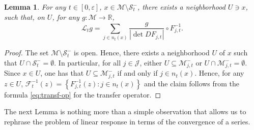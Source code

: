 \documentclass{amsart}
\numberwithin{equation}{section}
\newtheorem{lemma}[theorem]{Lemma}
\newcommand\ve{\varepsilon}
\newcommand\cF{{\mathcal F}}
\newcommand\cJ{{\mathcal J}}
\newcommand\cL{{\mathcal L}}
\newcommand\cM{{\mathcal M}}
\newcommand\cS{{\mathcal S}}
\newcommand\bR{{\mathbb R}}
\begin{document}
\begin{lemma}
  \label{lem:tr-op}
  For any \(t \in [0,\ve]\), \(x \in \cM \setminus \cS_t^{-}\), there exists a neighborhood \(U \ni x\), such that, on \(U\), for any \(g: \cM \to \bR\),
  \[
  \cL_t g = \sum_{j \in n_t(x)} \frac{g }{\left|\det D F_{j,t}\right|}\circ F_{j,t}^{-1}.
  \]
  \end{lemma}
  \begin{proof}
  The set \(\cM \setminus \cS^{-}_t\) is open. Hence, there exists a neighborhood \(U\) of \(x\) such that \(U \cap \cS_t^{-} = \emptyset\). In particular, for all \(j \in \cJ\), either \(U \subseteq \cM_{j,t}^{-}\) or \(U \cap \cM_{j,t}^{-} = \emptyset\). Since \(x \in U\), one has that \(U \subseteq \cM_{j,t}^{-}\) if and only if \(j \in n_t(x)\). Hence, for any \(z \in U\), \(\cF_t^{-1}(z) = \left\{F_{j,t}^{-1}(z) : j \in n_t(x)\right\}\) and the claim follows from the formula \eqref{eq:transf-op} for the transfer operator.
  \end{proof}
  
The next Lemma is nothing more than a simple observation that allows us to rephrase the problem of linear response in terms of the convergence of a series.
\end{document}
